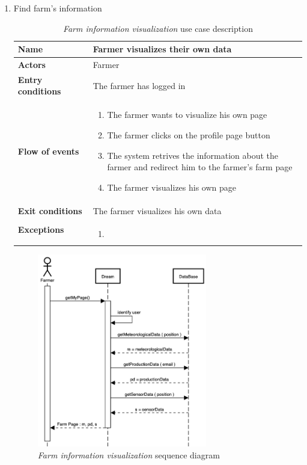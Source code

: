 \begin{enumerate}
    \item Find farm’s information
    \begin{longtable}{p{0.26\linewidth}p{0.75\linewidth}}
        \toprule
        \textbf{Name} & \textbf{Farmer visualizes their own data} \\
        \midrule
        \textbf{Actors} & Farmer \\
        \midrule
        \textbf{Entry conditions} & The farmer has logged in\\
        \midrule
        \textbf{Flow of events} & 
        \begin{enumerate}
            \item The farmer wants to visualize his own page
            \item The farmer clicks on the profile page button
            \item The system retrives the information about the farmer and redirect him to the farmer's farm page
            \item The farmer visualizes his own page
        \end{enumerate} \\
        \midrule
        \textbf{Exit conditions} & The farmer visualizes his own data\\
        \midrule
        \textbf{Exceptions} & 
        \begin{enumerate}
            \item
        \end{enumerate}\\
        \bottomrule
        \caption{\emph{Farm information visualization} use case description}
    \end{longtable}
    \begin{figure}[H]
        \begin{center}
        \includegraphics[width=0.7\textwidth]{sequence/FarmInformation.png}
        \caption{\emph{Farm information visualization} sequence diagram}
        \label{fig:sequence5}
        \end{center}
    \end{figure}


\end{enumerate}
